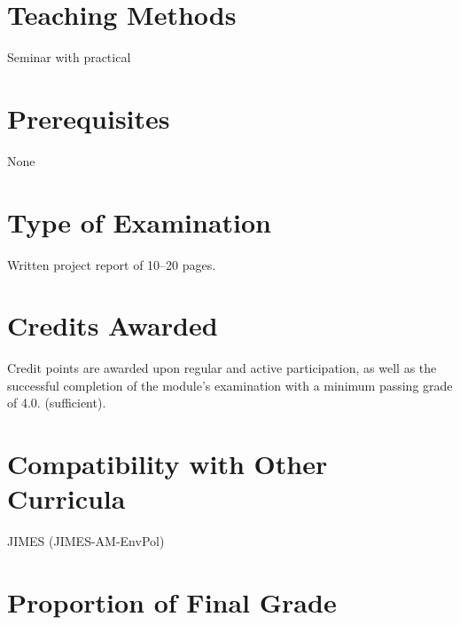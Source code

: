 \documentclass[
  letterpaper,
  10pt,
  openany]{book}
\begin{document}
\section*{Teaching Methods}\label{teaching-methods-5}


Seminar with practical

\section*{Prerequisites}\label{prerequisites-5}


None

\section*{Type of Examination}\label{type-of-examination-5}


Written project report of 10--20 pages.

\section*{Credits Awarded}\label{credits-awarded-5}


Credit points are awarded upon regular and active participation, as well
as the successful completion of the module's examination with a minimum
passing grade of 4.0. (sufficient).

\section*{Compatibility with Other
Curricula}\label{compatibility-with-other-curricula-5}


JIMES (JIMES-AM-EnvPol)

\section*{Proportion of Final Grade}\label{proportion-of-final-grade-5}
\end{document}

